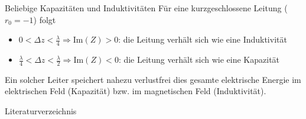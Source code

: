 \documentclass{beamer}
\begin{document}
\begin{frame}{Beliebige Kapazitäten und Induktivitäten}
Für eine kurzgeschlossene Leitung ($r_{0} = -1$) folgt
\begin{itemize}
    \item $0 < \Delta z < \frac{\lambda}{4} \Rightarrow \mathrm{Im}(Z) > 0$: die Leitung verhält
    sich wie eine Induktivität
    \item $\frac{\lambda}{4} < \Delta z < \frac{\lambda}{2} \Rightarrow \mathrm{Im}(Z) < 0$: die
    Leitung verhält sich wie eine Kapazität
\end{itemize}

Ein solcher Leiter speichert nahezu verlustfrei dies gesamte elektrische Energie
im elektrischen Feld (Kapazität) bzw. im magnetischen Feld (Induktivität).

\end{frame}


\begin{frame}{Literaturverzeichnis}
\printbibliography
\end{frame}
\end{document}
